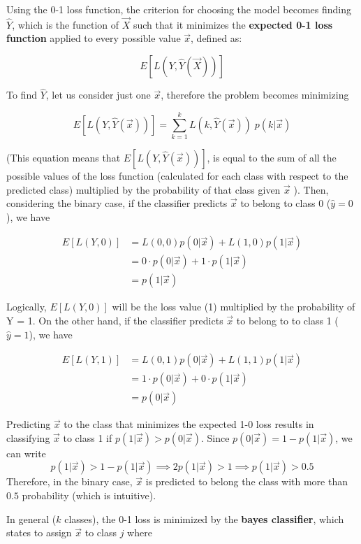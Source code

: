     Using the 0-1 loss function, the criterion for choosing the model becomes finding $\hat{Y}$, which is the function of $\vec{X}$ such that it minimizes the \textbf{expected 0-1 loss function} applied to every possible value $ \vec{x} $, defined as:

    $$ E[L(Y, \hat{Y}(\vec{X}))]$$

    To find $\hat{Y}$, let us consider just one $\vec{x}$, therefore the problem becomes minimizing 

    $$E[L(Y, \hat{Y}(\vec{x}))] = \sum_{k=1}^k L(k, \hat{Y}(\vec{x})) \; p(k|\vec{x})$$

	(This equation means that $ E[L(Y, \hat{Y}(\vec{x}))] $, is equal to the sum of all the possible values of the loss function (calculated for each class with respect to the predicted class) multiplied by the probability of that class given $ \vec{x} $ ).
    Then, considering the binary case, if the classifier predicts $\vec{x}$ to belong to class 0 ($\hat{y} = 0$), we have 

    \begin{align*}
      E[L(Y,0)] & = L(0,0)p(0|\vec{x}) + L(1, 0)p(1|\vec{x}) \\
                & = 0 \cdot p(0|\vec{x}) + 1 \cdot p(1|\vec{x}) \\
                & = p(1|\vec{x})
    \end{align*}

Logically, $ E[L(Y,0)] $ will be the loss value (1) multiplied by the probability of Y = 1. 
On the other hand, if the classifier predicts $\vec{x}$ to belong to to class 1 ($\hat{y} = 1$), we have

    \begin{align*}
      E[L(Y,1)] & = L(0,1)p(0|\vec{x}) + L(1, 1)p(1|\vec{x}) \\
                & = 1 \cdot p(0|\vec{x}) + 0 \cdot p(1|\vec{x}) \\
                & = p(0|\vec{x})
    \end{align*}

    Predicting $\vec{x}$ to the class that minimizes the expected 1-0 loss results in 
    classifying $\vec{x}$ to class 1 if $p(1|\vec{x}) > p(0|\vec{x})$.
    Since $p(0|\vec{x}) = 1 - p(1|\vec{x})$, we can write
    $$p(1|\vec{x}) > 1 - p(1|\vec{x}) \implies 2p(1|\vec{x}) > 1 \implies p(1|\vec{x})>0.5$$ 
    Therefore, in the binary case, $\vec{x}$ is predicted to belong the class with more than $0.5$ probability (which is intuitive).

    In general ($k$ classes), the 0-1 loss is minimized by the \textbf{bayes classifier}, which states to assign $\vec{x}$ to class $j$ where 

